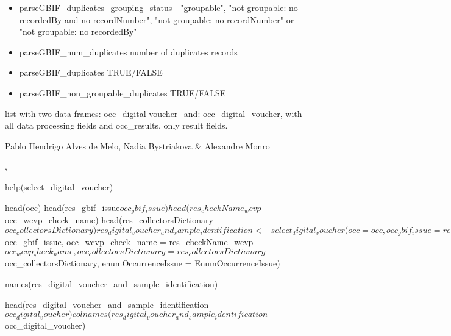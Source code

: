 \documentclass[a4paper]{book}
\begin{document}
%
\begin{Details}
\begin{itemize}

\item{} parseGBIF\_duplicates\_grouping\_status - "groupable", "not groupable: no recordedBy and no recordNumber",
"not groupable: no recordNumber" or "not groupable: no recordedBy"
\item{} parseGBIF\_num\_duplicates number of duplicates records
\item{} parseGBIF\_duplicates TRUE/FALSE
\item{} parseGBIF\_non\_groupable\_duplicates TRUE/FALSE

\end{itemize}

\end{Details}
%
\begin{Value}
list with two data frames: occ\_digital voucher\_and:
occ\_digital\_voucher,  with all data processing fields and
occ\_results, only result fields.
\end{Value}
%
\begin{Author}
Pablo Hendrigo Alves de Melo,
Nadia Bystriakova \&
Alexandre Monro
\end{Author}
%
\begin{SeeAlso}
, 
\end{SeeAlso}
%
\begin{Examples}
\begin{ExampleCode}

help(select_digital_voucher)

head(occ)
head(res_gbif_issue$occ_gbif_issue)
head(res_checkName_wcvp$occ_wcvp_check_name)
head(res_collectorsDictionary$occ_collectorsDictionary)
res_digital_voucher_and_sample_identification <- select_digital_voucher(occ = occ,
                                                                        occ_gbif_issue = res_gbif_issue$occ_gbif_issue,
                                                                        occ_wcvp_check_name = res_checkName_wcvp$occ_wcvp_check_name,
                                                                        occ_collectorsDictionary = res_collectorsDictionary$occ_collectorsDictionary,
                                                                        enumOccurrenceIssue = EnumOccurrenceIssue)

names(res_digital_voucher_and_sample_identification)

head(res_digital_voucher_and_sample_identification$occ_digital_voucher)
colnames(res_digital_voucher_and_sample_identification$occ_digital_voucher)


\end{ExampleCode}
\end{Examples}
\end{document}
